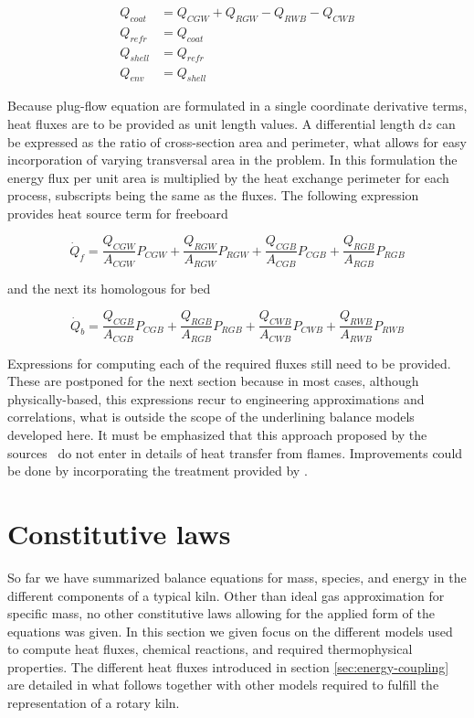 \documentclass[11pt]{paper}
\begin{document}
\begin{align}
Q_{coat}  &= Q_{CGW} + Q_{RGW} - Q_{RWB} - Q_{CWB}\label{eq:constraint-q1}\\
Q_{refr}  &= Q_{coat}\label{eq:constraint-q2}\\
Q_{shell} &= Q_{refr}\label{eq:constraint-q3}\\
Q_{env}   &= Q_{shell}\label{eq:constraint-q4}
\end{align}

Because plug-flow equation are formulated in a single coordinate derivative terms, heat fluxes are to be provided as unit length values. A differential length $\mathrm{d}z$ can be expressed as the ratio of cross-section area and perimeter, what allows for easy incorporation of varying transversal area in the problem. In this formulation the energy flux per unit area is multiplied by the heat exchange perimeter for each process, subscripts being the same as the fluxes. The following expression provides heat source term for freeboard

\begin{equation}
\dot{Q}_{f}
=\frac{Q_{CGW}}{A_{CGW}}P_{CGW}
+\frac{Q_{RGW}}{A_{RGW}}P_{RGW}
+\frac{Q_{CGB}}{A_{CGB}}P_{CGB}
+\frac{Q_{RGB}}{A_{RGB}}P_{RGB}
\end{equation}

\noindent{}and the next its homologous for bed

\begin{equation}
\dot{Q}_{b}
=\frac{Q_{CGB}}{A_{CGB}}P_{CGB}
+\frac{Q_{RGB}}{A_{RGB}}P_{RGB}
+\frac{Q_{CWB}}{A_{CWB}}P_{CWB}
+\frac{Q_{RWB}}{A_{RWB}}P_{RWB}
\end{equation}

Expressions for computing each of the required fluxes still need to be provided. These are postponed for the next section because in most cases, although physically-based, this expressions recur to engineering approximations and correlations, what is outside the scope of the underlining balance models developed here. It must be emphasized that this approach proposed by the sources~\cite{Mujumdar2006i,Hanein2017} do not enter in details of heat transfer from flames. Improvements could be done by incorporating the treatment provided by \textcite{Gorog1983}.

\section{Constitutive laws}

So far we have summarized balance equations for mass, species, and energy in the different components of a typical kiln. Other than ideal gas approximation for specific mass, no other constitutive laws allowing for the applied form of the equations was given. In this section we given focus on the different models used to compute heat fluxes, chemical reactions, and required thermophysical properties. The different heat fluxes introduced in section \ref{sec:energy-coupling} are detailed in what follows together with other models required to fulfill the representation of a rotary kiln.
\end{document}
